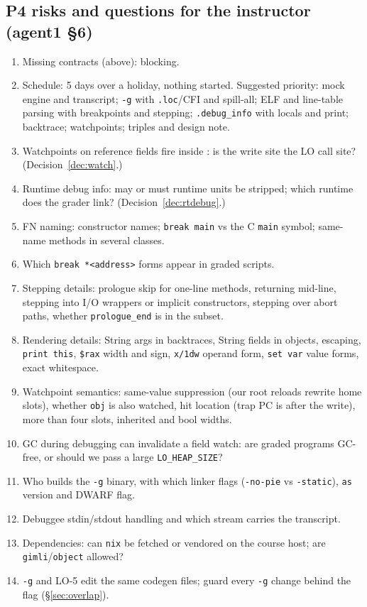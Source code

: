 \documentclass[10pt]{article}
\newcommand{\code}[1]{\texttt{\small #1}}
\begin{document}
\subsection{P4 risks and questions for the instructor (agent1 §6)}\label{sec:risk-p4}
\begin{enumerate}[label=R\arabic*.,leftmargin=2.2em]
\item Missing contracts (above): blocking.
\item Schedule: 5 days over a holiday, nothing started. Suggested priority: mock engine and transcript; \code{-g} with \code{.loc}/CFI and spill-all; ELF and line-table parsing with breakpoints and stepping; \code{.debug\_info} with locals and print; backtrace; watchpoints; triples and design note.
\item Watchpoints on reference fields fire inside : is the write site the LO call site? (Decision~\ref{dec:watch}.)
\item Runtime debug info: may or must runtime units be stripped; which runtime does the grader link? (Decision~\ref{dec:rtdebug}.)
\item FN naming: constructor names; \code{break main} vs the C \code{main} symbol; same-name methods in several classes.
\item Which \code{break *<address>} forms appear in graded scripts.
\item Stepping details: prologue skip for one-line methods, returning mid-line, stepping into I/O wrappers or implicit constructors, stepping over abort paths, whether \code{prologue\_end} is in the subset.
\item Rendering details: String args in backtraces, String fields in objects, escaping, \code{print this}, \code{\$rax} width and sign, \code{x/1dw} operand form, \code{set var} value forms, exact whitespace.
\item Watchpoint semantics: same-value suppression (our root reloads rewrite home slots), whether \code{obj} is also watched, hit location (trap PC is after the write), more than four slots, inherited and bool widths.
\item GC during debugging can invalidate a field watch: are graded programs GC-free, or should we pass a large \code{LO\_HEAP\_SIZE}?
\item Who builds the \code{-g} binary, with which linker flags (\code{-no-pie} vs \code{-static}), \code{as} version and DWARF flag.
\item Debuggee stdin/stdout handling and which stream carries the transcript.
\item Dependencies: can \code{nix} be fetched or vendored on the course host; are \code{gimli}/\code{object} allowed?
\item \code{-g} and LO-5 edit the same codegen files; guard every \code{-g} change behind the flag (\S\ref{sec:overlap}).
\end{enumerate}
\end{document}
